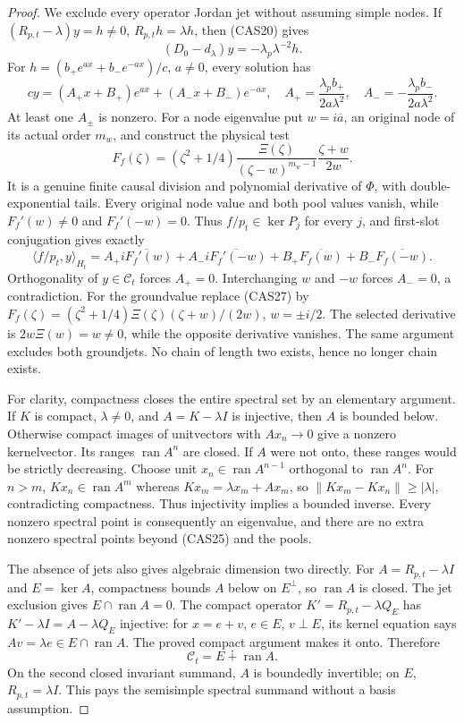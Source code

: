 \documentclass[11pt]{article}
\theoremstyle{remark}\newtheorem{remark}[theorem]{Remark}
\begin{document}
\begin{proof}
We exclude every operator Jordan jet without assuming simple nodes.
If \((R_{p,t}-\lambda)y=h\ne0\),
\(R_{p,t}h=\lambda h\), then (CAS20) gives
\[
 (D_0-d_\lambda)y=-\lambda_p\lambda^{-2}h.
\]
For \(h=(b_+e^{ax}+b_-e^{-ax})/c\), \(a\ne0\), every solution has
\[
 cy=(A_+x+B_+)e^{ax}+(A_-x+B_-)e^{-ax},\quad
 A_+=\frac{\lambda_pb_+}{2a\lambda^2},\quad
 A_-=-\frac{\lambda_pb_-}{2a\lambda^2}.                  \tag{CAS26}
\]
At least one \(A_\pm\) is nonzero. For a node eigenvalue put
\(w=i\overline a\), an original node of its actual order \(m_w\),
and construct the physical test
\[
 F_f(\zeta)=(\zeta^2+1/4)
       \frac{\Xi(\zeta)}{(\zeta-w)^{m_w-1}}
                         \frac{\zeta+w}{2w}.            \tag{CAS27}
\]
It is a genuine finite causal division and polynomial derivative
of \(\Phi\), with double-exponential tails. Every original node
value and both pool values vanish, while
\(F_f'(w)\ne0\) and \(F_f'(-w)=0\). Thus
\(f/p_t\in\ker P_j\) for every \(j\), and first-slot conjugation
gives exactly
\[
 \langle f/p_t,y\rangle_{H_t}
   =A_+\overline{iF_f'(w)}+A_-\overline{iF_f'(-w)}
       +B_+\overline{F_f(w)}+B_-\overline{F_f(-w)}.       \tag{CAS28}
\]
Orthogonality of \(y\in\mathcal C_t\) forces \(A_+=0\).
Interchanging \(w\) and \(-w\) forces \(A_-=0\), a contradiction.
For the groundvalue replace (CAS27) by
\(F_f(\zeta)=(\zeta^2+1/4)\Xi(\zeta)(\zeta+w)/(2w)\),
\(w=\pm i/2\). The selected derivative is
\(2w\Xi(w)=w\ne0\), while the opposite derivative vanishes.
The same argument excludes both groundjets. No chain of length
two exists, hence no longer chain exists.

For clarity, compactness closes the entire spectral set by an
elementary argument. If \(K\) is compact, \(\lambda\ne0\), and
\(A=K-\lambda I\) is injective, then \(A\) is bounded below.
Otherwise compact images of unitvectors with \(Ax_n\to0\) give a
nonzero kernelvector. Its ranges \(\operatorname{ran}A^n\) are
closed. If \(A\) were not onto, these ranges would be strictly
decreasing. Choose unit \(x_n\in\operatorname{ran}A^{n-1}\)
orthogonal to \(\operatorname{ran}A^n\). For \(n>m\),
\(Kx_n\in\operatorname{ran}A^m\) whereas
\(Kx_m=\lambda x_m+Ax_m\), so
\(\|Kx_m-Kx_n\|\ge|\lambda|\), contradicting compactness.
Thus injectivity implies a bounded inverse. Every nonzero spectral
point is consequently an eigenvalue, and there are no extra
nonzero spectral points beyond (CAS25) and the pools.

The absence of jets also gives algebraic dimension two directly.
For \(A=R_{p,t}-\lambda I\) and \(E=\ker A\), compactness bounds
\(A\) below on \(E^\perp\), so \(\operatorname{ran}A\) is closed.
The jet exclusion gives \(E\cap\operatorname{ran}A=0\).
The compact operator \(K'=R_{p,t}-\lambda Q_E\) has
\(K'-\lambda I=A-\lambda Q_E\) injective: for \(x=e+v\),
\(e\in E\), \(v\perp E\), its kernel equation says
\(Av=\lambda e\in E\cap\operatorname{ran}A\).
The proved compact argument makes it onto. Therefore
\[
 \mathcal C_t=E\dotplus\operatorname{ran}A.               \tag{CAS29}
\]
On the second closed invariant summand, \(A\) is boundedly
invertible; on \(E\), \(R_{p,t}=\lambda I\). This pays the
semisimple spectral summand without a basis assumption.


\end{proof}
\end{document}
